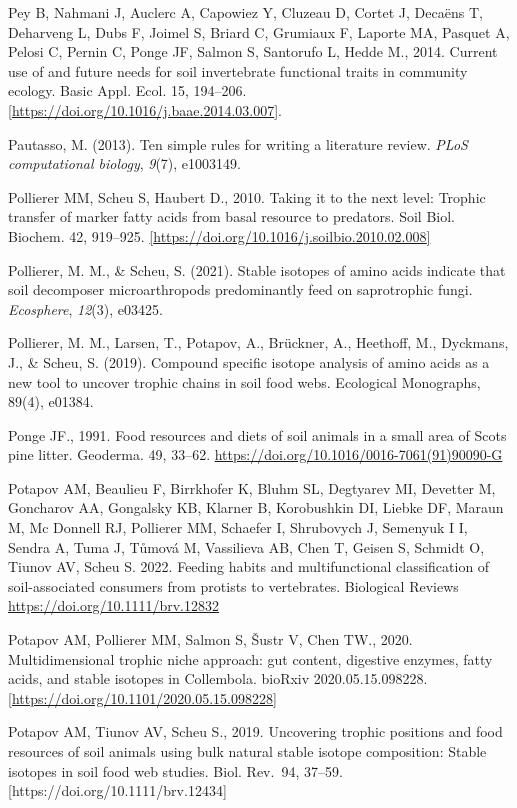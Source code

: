 \documentclass[11pt]{article}
\begin{document}
Pey B, Nahmani J, Auclerc A, Capowiez Y, Cluzeau D, Cortet J, Decaëns T,
Deharveng L, Dubs F, Joimel S, Briard C, Grumiaux F, Laporte MA, Pasquet
A, Pelosi C, Pernin C, Ponge JF, Salmon S, Santorufo L, Hedde M., 2014.
Current use of and future needs for soil invertebrate functional traits
in community ecology. Basic Appl. Ecol. 15, 194--206.
\href{https://doi.org/10.1016/j.baae.2014.03.007}{{[}https://doi.org/10.1016/j.baae.2014.03.007{]}}.

Pautasso, M. (2013). Ten simple rules for writing a literature review.
\emph{PLoS computational biology}, \emph{9}(7), e1003149.

Pollierer MM, Scheu S, Haubert D., 2010. Taking it to the next level:
Trophic transfer of marker fatty acids from basal resource to predators.
Soil Biol. Biochem. 42, 919--925.
\href{https://doi.org/10.1016/j.soilbio.2010.02.008}{{[}https://doi.org/10.1016/j.soilbio.2010.02.008{]}}

Pollierer, M. M., \& Scheu, S. (2021). Stable isotopes of amino acids
indicate that soil decomposer microarthropods predominantly feed on
saprotrophic fungi. \emph{Ecosphere}, \emph{12}(3), e03425.

Pollierer, M. M., Larsen, T., Potapov, A., Brückner, A., Heethoff, M.,
Dyckmans, J., \& Scheu, S. (2019). Compound specific isotope analysis of
amino acids as a new tool to uncover trophic chains in soil food webs.
Ecological Monographs, 89(4), e01384.

Ponge JF., 1991. Food resources and diets of soil animals in a small
area of Scots pine litter. Geoderma. 49, 33--62.
\url{https://doi.org/10.1016/0016-7061(91)90090-G}

Potapov AM, Beaulieu F, Birrkhofer K, Bluhm SL, Degtyarev MI, Devetter
M, Goncharov AA, Gongalsky KB, Klarner B, Korobushkin DI, Liebke DF,
Maraun M, Mc Donnell RJ, Pollierer MM, Schaefer I, Shrubovych J,
Semenyuk I I, Sendra A, Tuma J, Tůmová M, Vassilieva AB, Chen T, Geisen
S, Schmidt O, Tiunov AV, Scheu S. 2022. Feeding habits and
multifunctional classification of soil-associated consumers from
protists to vertebrates. Biological Reviews
\url{https://doi.org/10.1111/brv.12832}

Potapov AM, Pollierer MM, Salmon S, Šustr V, Chen TW., 2020.
Multidimensional trophic niche approach: gut content, digestive enzymes,
fatty acids, and stable isotopes in Collembola. bioRxiv
2020.05.15.098228.
\href{https://doi.org/10.1101/2020.05.15.098228}{{[}https://doi.org/10.1101/2020.05.15.098228{]}}

Potapov AM, Tiunov AV, Scheu S., 2019. Uncovering trophic positions and
food resources of soil animals using bulk natural stable isotope
composition: Stable isotopes in soil food web studies. Biol. Rev.~94,
37--59. {[}https://doi.org/10.1111/brv.12434{]}
\end{document}
